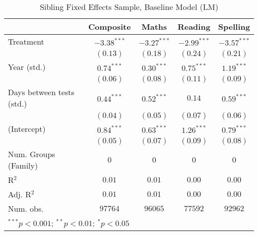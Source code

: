 
\begin{table}
\begin{center}
\begin{tabular}{l c c c c}
\hline
 & Composite & Maths & Reading & Spelling \\
\hline
Treatment                 & $-3.38^{***}$ & $-3.27^{***}$ & $-2.99^{***}$ & $-3.57^{***}$ \\
                          & $(0.13)$      & $(0.18)$      & $(0.24)$      & $(0.21)$      \\
Year (std.)               & $0.74^{***}$  & $0.30^{***}$  & $0.75^{***}$  & $1.19^{***}$  \\
                          & $(0.06)$      & $(0.08)$      & $(0.11)$      & $(0.09)$      \\
Days between tests (std.) & $0.44^{***}$  & $0.52^{***}$  & $0.14$        & $0.59^{***}$  \\
                          & $(0.04)$      & $(0.05)$      & $(0.07)$      & $(0.06)$      \\
(Intercept)               & $0.84^{***}$  & $0.63^{***}$  & $1.26^{***}$  & $0.79^{***}$  \\
                          & $(0.05)$      & $(0.07)$      & $(0.09)$      & $(0.08)$      \\
\hline
Num. Groups (Family)      & $0$           & $0$           & $0$           & $0$           \\
R$^2$                     & $0.01$        & $0.01$        & $0.00$        & $0.00$        \\
Adj. R$^2$                & $0.01$        & $0.01$        & $0.00$        & $0.00$        \\
Num. obs.                 & $97764$       & $96065$       & $77592$       & $92962$       \\
\hline
\multicolumn{5}{l}{\scriptsize{$^{***}p<0.001$; $^{**}p<0.01$; $^{*}p<0.05$}}
\end{tabular}
\caption{Sibling Fixed Effects Sample, Baseline Model (LM)}
\label{table:baseline}
\end{center}
\end{table}
